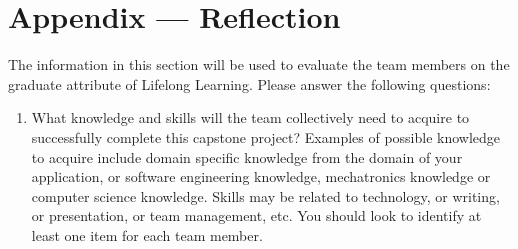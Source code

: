 \documentclass[12pt]{article}
\begin{document}
\newpage

\newpage{}
\section*{Appendix --- Reflection}

The information in this section will be used to evaluate the team members on the
graduate attribute of Lifelong Learning.  Please answer the following questions:

\begin{enumerate}
  \item What knowledge and skills will the team collectively need to acquire to
  successfully complete this capstone project?  Examples of possible knowledge
  to acquire include domain specific knowledge from the domain of your
  application, or software engineering knowledge, mechatronics knowledge or
  computer science knowledge.  Skills may be related to technology, or writing,
  or presentation, or team management, etc.  You should look to identify at
  least one item for each team member.


\end{enumerate}
\end{document}
